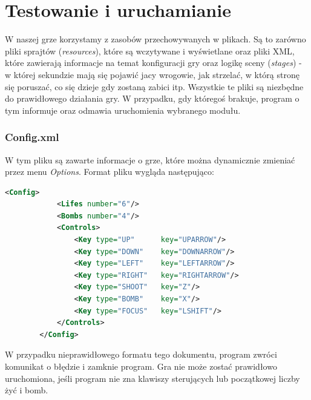 \newpage
\part{\huge \textbf{Testowanie i uruchamianie}}
	W naszej grze korzystamy z zasobów przechowywanych w plikach. Są to zarówno pliki sprajtów (\emph{resources}), które są wczytywane i wyświetlane oraz pliki XML, które zawierają informacje na temat konfiguracji gry oraz logikę sceny (\emph{stages}) - w której sekundzie mają się pojawić jacy wrogowie, jak strzelać, w którą stronę się poruszać, co się dzieje gdy zostaną zabici itp. Wszystkie te pliki są niezbędne do prawidłowego działania gry. W przypadku, gdy któregoś brakuje, program o tym informuje oraz odmawia uruchomienia wybranego modułu.
	\section{Config.xml}
		W tym pliku są zawarte informacje o grze, które można dynamicznie zmieniać przez menu \emph{Options}. Format pliku wygląda następująco:
		\begin{lstlisting}[language=xml]
		<Config>
			<Lifes number="6"/>
			<Bombs number="4"/>
			<Controls>
				<Key type="UP" 		key="UPARROW"/>
				<Key type="DOWN" 	key="DOWNARROW"/>
				<Key type="LEFT" 	key="LEFTARROW"/>
				<Key type="RIGHT" 	key="RIGHTARROW"/>
				<Key type="SHOOT" 	key="Z"/>
				<Key type="BOMB" 	key="X"/>
				<Key type="FOCUS" 	key="LSHIFT"/>
			</Controls>
		</Config>
		\end{lstlisting}
		W przypadku nieprawidłowego formatu tego dokumentu, program zwróci komunikat o błędzie i zamknie program. Gra nie może zostać prawidłowo uruchomiona, jeśli program nie zna klawiszy sterujących lub początkowej liczby żyć i bomb.
